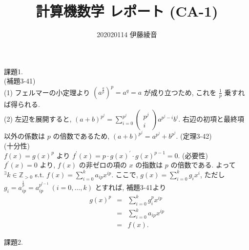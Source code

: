 \documentclass[dvipdfmx]{jsarticle}
\title{計算機数学 レポート (CA-1)}
\author{202020114 伊藤綾音}
\begin{document}
\maketitle

\noindent
課題1.\\
(補題3-41)\\
(1) フェルマーの小定理より $(a^{\frac{q}{p}})^{p} = a^{q} = a$ が成り立つため, これを $\frac{1}{p}$ 乗すれば得られる. \\
(2) 左辺を展開すると, $\displaystyle (a+b)^{p^{j}} = \sum_{i=0}^{p^{j}} \begin{pmatrix} p^{j} \\ i \end{pmatrix} a^{p^{j}-i}b^{i}$. 
右辺の初項と最終項以外の係数は $p$ の倍数であるため, $(a+b)^{p^{j}} = a^{p^{j}} + b^{p^{j}}$.
(定理3-42)\\
(十分性)\\
$f(x) = g(x)^{p}$ より $f^{\prime}(x) = p \cdot g(x)^{\prime} \cdot g(x)^{p-1} = 0$.
(必要性)\\
$f^{\prime}(x) = 0$ より, $f(x)$ の非ゼロの項の $x$ の指数は $p$ の倍数である. よって $^{\exists}k \in \mathbb{Z}_{>0}$ s.t. $\displaystyle f(x) = \sum_{i=0}^{k} a_{ip}x^{ip}$. 
ここで, $\displaystyle g(x) = \sum_{i=0}^{k} g_{i}x^{i}$, ただし $g_{i} = a_{ip}^{\frac{1}{p}} = a_{ip}^{p^{l-1}} \ (i = 0, \ldots, k)$ とすれば, 補題3-41より
\begin{eqnarray}
g(x)^{p} & = & \sum_{i=0}^{k} g_{i}^{p}x^{ip} \nonumber \\
         & = & \sum_{i=0}^{k} a_{ip}x^{ip} \nonumber \\
         & = & f(x). \nonumber
\end{eqnarray}

\noindent
課題2.
\end{document}
